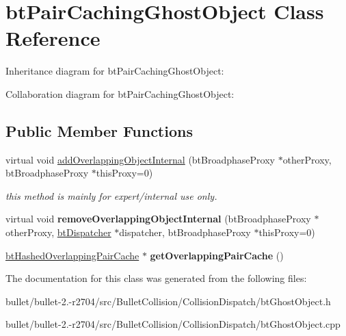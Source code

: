 \hypertarget{classbt_pair_caching_ghost_object}{\section{bt\+Pair\+Caching\+Ghost\+Object Class Reference}
\label{classbt_pair_caching_ghost_object}
}


Inheritance diagram for bt\+Pair\+Caching\+Ghost\+Object\+:


Collaboration diagram for bt\+Pair\+Caching\+Ghost\+Object\+:
\subsection*{Public Member Functions}
\begin{DoxyCompactItemize}
\item 
\hypertarget{classbt_pair_caching_ghost_object_a636e114951f6fdf8a1f5a2b46849a9a7}{virtual void \hyperlink{classbt_pair_caching_ghost_object_a636e114951f6fdf8a1f5a2b46849a9a7}{add\+Overlapping\+Object\+Internal} (bt\+Broadphase\+Proxy $\ast$other\+Proxy, bt\+Broadphase\+Proxy $\ast$this\+Proxy=0)}\label{classbt_pair_caching_ghost_object_a636e114951f6fdf8a1f5a2b46849a9a7}

\begin{DoxyCompactList}\small\item\em this method is mainly for expert/internal use only. \end{DoxyCompactList}\item 
\hypertarget{classbt_pair_caching_ghost_object_aa9d4f947633e44d523b89a86c5e3ec38}{virtual void {\bfseries remove\+Overlapping\+Object\+Internal} (bt\+Broadphase\+Proxy $\ast$other\+Proxy, \hyperlink{classbt_dispatcher}{bt\+Dispatcher} $\ast$dispatcher, bt\+Broadphase\+Proxy $\ast$this\+Proxy=0)}\label{classbt_pair_caching_ghost_object_aa9d4f947633e44d523b89a86c5e3ec38}

\item 
\hypertarget{classbt_pair_caching_ghost_object_abb7e23dcf9e936fb28ce6d90d48c2a55}{\hyperlink{classbt_hashed_overlapping_pair_cache}{bt\+Hashed\+Overlapping\+Pair\+Cache} $\ast$ {\bfseries get\+Overlapping\+Pair\+Cache} ()}\label{classbt_pair_caching_ghost_object_abb7e23dcf9e936fb28ce6d90d48c2a55}

\end{DoxyCompactItemize}


The documentation for this class was generated from the following files\+:\begin{DoxyCompactItemize}
\item 
bullet/bullet-\/2.-\/r2704/src/\+Bullet\+Collision/\+Collision\+Dispatch/bt\+Ghost\+Object.\+h\item 
bullet/bullet-\/2.-\/r2704/src/\+Bullet\+Collision/\+Collision\+Dispatch/bt\+Ghost\+Object.\+cpp\end{DoxyCompactItemize}
